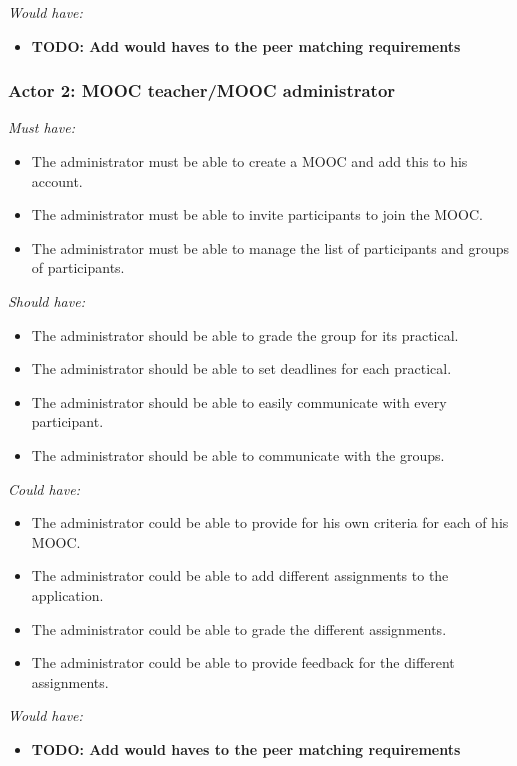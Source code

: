 \documentclass[]{article}
\newcommand{\TODO}[1]{{\color{red}\textbf{TODO: #1}}}
\newcommand{\reqr}[1]{{\noindent\emph{#1:}}}
\begin{document}
\reqr{Would have}
\begin{itemize}
\item \TODO{Add would haves to the peer matching requirements}
\end{itemize}

\subsubsection{Actor 2: MOOC teacher/MOOC administrator}
\reqr{Must have}
\begin{itemize}
\item The administrator must be able to create a MOOC and add this to his account.
\item The administrator must be able to invite participants to join the MOOC.
\item The administrator must be able to manage the list of participants and groups of participants.
\end{itemize}

\reqr{Should have}
\begin{itemize}
\item The administrator should be able to grade the group for its practical.
\item The administrator should be able to set deadlines for each practical.
\item The administrator should be able to easily communicate with every participant.
\item The administrator should be able to communicate with the groups.
\end{itemize}

\reqr{Could have}
\begin{itemize}
\item The administrator could be able to provide for his own criteria for each of his MOOC.
\item The administrator could be able to add different assignments to the application.
\item The administrator could be able to grade the different assignments.
\item The administrator could be able to provide feedback for the different assignments.
\end{itemize}

\reqr{Would have}
\begin{itemize}
\item \TODO{Add would haves to the peer matching requirements}
\end{itemize}
\end{document}
